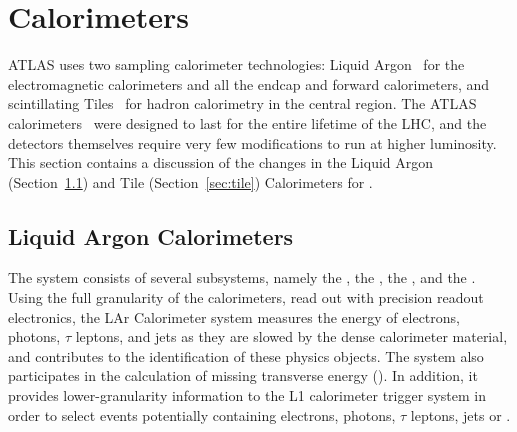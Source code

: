 \documentclass[cernpreprint, atlasdraft=false, UKenglish,british,orcidlogo, texmf, orcidlogo]{atlasdoc}
\begin{document}
\clearpage
\newpage
 
\section{Calorimeters} 
\label{sec:Calorimeters}
 

ATLAS uses two sampling calorimeter technologies: Liquid Argon~\cite{ATLAS-TDR-02} for the electromagnetic calorimeters and all the endcap and forward calorimeters, and scintillating Tiles~\cite{ATLAS-TDR-03} for hadron calorimetry in the central region.
The ATLAS calorimeters~\cite{LARG-2009-01} were designed to last for the entire lifetime of the \gls{LHC}, and the detectors themselves require very few modifications to run at higher luminosity.
This section contains a discussion of the changes in the Liquid Argon (Section~\ref{sec:LAr}) and Tile (Section~\ref{sec:tile}) Calorimeters for \RunThr.
 
\subsection{Liquid Argon Calorimeters}
\label{sec:LAr}
The  system consists of several subsystems, namely the
, the , the ,
and the .
Using the full granularity of the calorimeters, read out with precision readout electronics,
the \gls{LAr} Calorimeter system
measures the energy
of electrons, photons, $\tau$ leptons, and jets
as they are slowed by the dense calorimeter material,
and contributes to the identification of these physics objects.
The system
also participates in the calculation of missing transverse energy (\met). In addition, it provides
lower-granularity information to the \gls{L1} calorimeter trigger system in order to select
events potentially containing electrons, photons, $\tau$ leptons, jets or \met.
 
\end{document}
